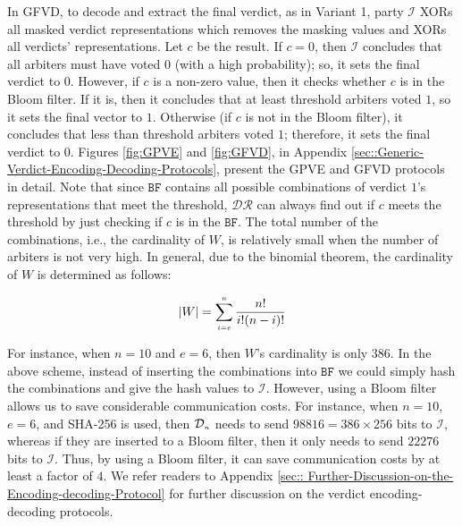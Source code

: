In GFVD, to decode and extract the final verdict, as in Variant 1, party $\mathcal{I}$  XORs all masked verdict representations which  removes the masking values and XORs all verdicts’ representations. Let $c$ be the result.  If $c=0$, then $\mathcal{I}$ concludes that all arbiters must have voted $0$ (with a high probability); so, it sets the final verdict to $0$. However, if $c$ is a non-zero value, then it checks whether $c$ is in the Bloom filter. If it is, then it concludes that at least threshold arbiters voted $1$, so it sets the final vector to $1$. Otherwise (if $c$ is not in the Bloom filter), it concludes that less than threshold arbiters voted $1$; therefore, it sets the final verdict to $0$.  Figures \ref{fig:GPVE} and \ref{fig:GFVD}, in Appendix \ref{sec::Generic-Verdict-Encoding-Decoding-Protocols}, present the  GPVE and GFVD protocols in detail. Note that since $\mathtt{BF}$ contains all possible combinations of verdict $1$'s representations that meet the threshold,  $\mathcal{DR}$ can always find out if $c$ meets the threshold by just checking if $c$ is in the $\mathtt{BF}$. The total number of the combinations, i.e., the cardinality of $W$, is relatively small when the number of arbiters is not very high. In general,  due to the  binomial theorem, the cardinality of $W$ is determined as follows:
%

\begin{equation*}
|W|=\sum\limits_{\scriptscriptstyle i=e}^{\scriptscriptstyle n}\frac{n!}{i!(n- i)!}
 \end{equation*}
 
 For instance, when $n=10$ and  $e=6$, then $W$'s cardinality is only $386$.  In the above scheme, instead of inserting the combinations into $\mathtt{BF}$ we could simply hash  the combinations and give the hash values to $\mathcal{I}$. However, using a Bloom filter allows us to save considerable communication costs. For instance, when $n=10$, $e=6$, and SHA-256 is used, then $\mathcal{D}_{\scriptscriptstyle n}$ needs to send  $98816=386\times 256$ bits to $\mathcal{I}$, whereas  if they are inserted to a Bloom filter, then it only needs to send $22276 $ bits to $\mathcal{I}$. Thus, by using a Bloom filter,  it  can save  communication costs by at least a factor of  $4$. We refer readers to Appendix \ref{sec:: Further-Discussion-on-the-Encoding-decoding-Protocol} for  further discussion on the verdict encoding-decoding protocols. 
 
 
 
 

 
 




